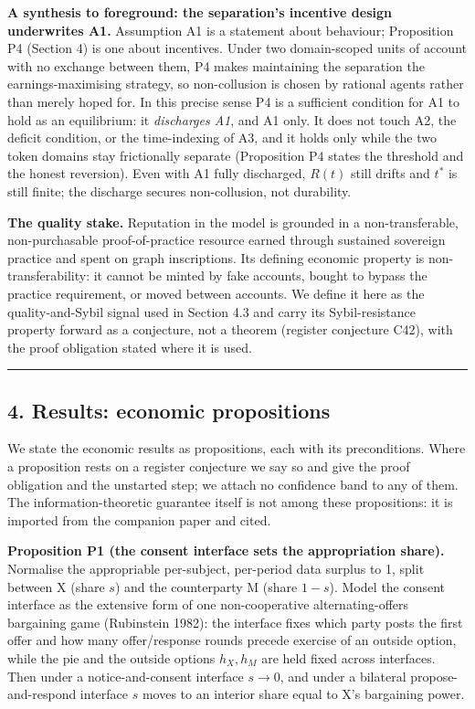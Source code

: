 \documentclass[
  11pt,
]{article}
\begin{document}
\textbf{A synthesis to foreground: the separation's incentive design
underwrites A1.} Assumption A1 is a statement about behaviour;
Proposition P4 (Section 4) is one about incentives. Under two
domain-scoped units of account with no exchange between them, P4 makes
maintaining the separation the earnings-maximising strategy, so
non-collusion is chosen by rational agents rather than merely hoped for.
In this precise sense P4 is a sufficient condition for A1 to hold as an
equilibrium: it \emph{discharges A1}, and A1 only. It does not touch A2,
the deficit condition, or the time-indexing of A3, and it holds only
while the two token domains stay frictionally separate (Proposition P4
states the threshold and the honest reversion). Even with A1 fully
discharged, \(R(t)\) still drifts and \(t^{*}\) is still finite; the
discharge secures non-collusion, not durability.

\textbf{The quality stake.} Reputation in the model is grounded in a
non-transferable, non-purchasable proof-of-practice resource earned
through sustained sovereign practice and spent on graph inscriptions.
Its defining economic property is non-transferability: it cannot be
minted by fake accounts, bought to bypass the practice requirement, or
moved between accounts. We define it here as the quality-and-Sybil
signal used in Section 4.3 and carry its Sybil-resistance property
forward as a conjecture, not a theorem (register conjecture C42), with
the proof obligation stated where it is used.

\begin{center}\rule{0.5\linewidth}{0.5pt}\end{center}

\subsection{4. Results: economic
propositions}\label{results-economic-propositions}

We state the economic results as propositions, each with its
preconditions. Where a proposition rests on a register conjecture we say
so and give the proof obligation and the unstarted step; we attach no
confidence band to any of them. The information-theoretic guarantee
itself is not among these propositions: it is imported from the
companion paper and cited.

\textbf{Proposition P1 (the consent interface sets the appropriation
share).} Normalise the appropriable per-subject, per-period data surplus
to 1, split between X (share \(s\)) and the counterparty M (share
\(1-s\)). Model the consent interface as the extensive form of one
non-cooperative alternating-offers bargaining game (Rubinstein 1982):
the interface fixes which party posts the first offer and how many
offer/response rounds precede exercise of an outside option, while the
pie and the outside options \(h_X, h_M\) are held fixed across
interfaces. Then under a notice-and-consent interface \(s \to 0\), and
under a bilateral propose-and-respond interface \(s\) moves to an
interior share equal to X's bargaining power.
\end{document}
